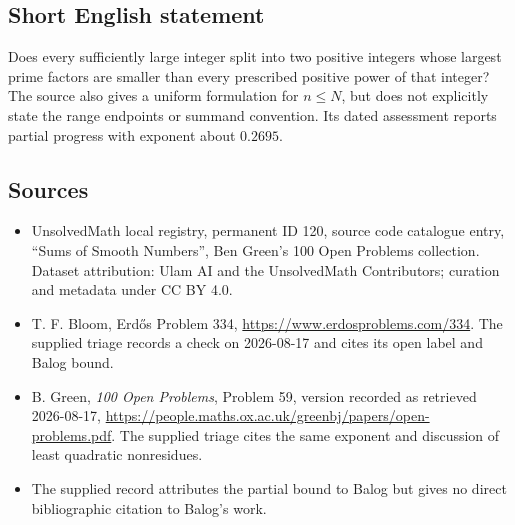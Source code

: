 \documentclass[11pt]{article}
\begin{document}
\subsection{Short English statement}
Does every sufficiently large integer split into two positive integers whose largest prime factors are smaller than every prescribed positive power of that integer? The source also gives a uniform formulation for $n\leq N$, but does not explicitly state the range endpoints or summand convention. Its dated assessment reports partial progress with exponent about $0.2695$.
\subsection{Sources}
\begin{itemize}
\item UnsolvedMath local registry, permanent ID 120, source code catalogue entry, ``Sums of Smooth Numbers'', Ben Green's 100 Open Problems collection. Dataset attribution: Ulam AI and the UnsolvedMath Contributors; curation and metadata under CC BY 4.0.
\item T. F. Bloom, Erd\H{o}s Problem 334, \url{https://www.erdosproblems.com/334}. The supplied triage records a check on 2026-08-17 and cites its open label and Balog bound.
\item B. Green, \emph{100 Open Problems}, Problem 59, version recorded as retrieved 2026-08-17, \url{https://people.maths.ox.ac.uk/greenbj/papers/open-problems.pdf}. The supplied triage cites the same exponent and discussion of least quadratic nonresidues.
\item The supplied record attributes the partial bound to Balog but gives no direct bibliographic citation to Balog's work.
\end{itemize}
\end{document}
